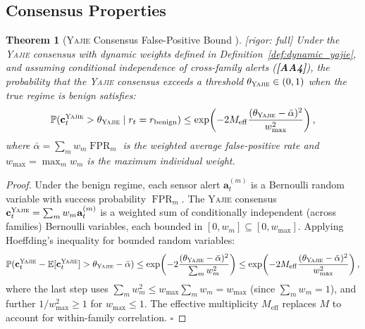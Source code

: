 \documentclass[11pt,a4paper]{article}
\newtheorem{theorem}{Theorem}[section]
\theoremstyle{definition}
\theoremstyle{remark}
\newcommand{\rigorFull}{\textcolor{green!60!black}{[rigor: full]}}
\newcommand{\assumptionTag}[1]{\textsf{\textbf{[A#1]}}}
\newcommand{\Yajie}{\textsc{Yajie}}
\DeclareMathOperator{\FPR}{FPR}
\newcommand{\E}{\mathbb{E}}
\newcommand{\Pbb}{\mathbb{P}}
\newcommand{\alertvec}{\mathbf{a}}
\begin{document}
\subsection{Consensus Properties}

\begin{theorem}[\Yajie{} Consensus False-Positive Bound ]
\label{thm:yajie_fp}
\rigorFull
Under the \Yajie{} consensus with dynamic weights defined in Definition~\ref{def:dynamic_yajie}, and assuming conditional independence of cross-family alerts (\assumptionTag{A4}), the probability that the \Yajie{} consensus exceeds a threshold $\theta_{\Yajie} \in (0, 1)$ when the true regime is benign satisfies:
\begin{equation}
\Pbb(\mathbf{c}_t^{\Yajie} > \theta_{\Yajie} \mid r_t = r_{\mathrm{benign}}) \leq \exp\!\left(-2 M_{\mathrm{eff}} \frac{(\theta_{\Yajie} - \bar{\alpha})^2}{w_{\max}^2}\right),
\label{eq:yajie_fp_bound}
\end{equation}
where $\bar{\alpha} = \sum_m w_m \FPR_m$ is the weighted average false-positive rate and $w_{\max} = \max_m w_m$ is the maximum individual weight.
\end{theorem}

\begin{proof}
Under the benign regime, each sensor alert $\alertvec_t^{(m)}$ is a Bernoulli random variable with success probability $\FPR_m$. The \Yajie{} consensus $\mathbf{c}_t^{\Yajie} = \sum_m w_m \alertvec_t^{(m)}$ is a weighted sum of conditionally independent (across families) Bernoulli variables, each bounded in $[0, w_m] \subseteq [0, w_{\max}]$. Applying Hoeffding's inequality for bounded random variables:
\begin{equation}
\Pbb(\mathbf{c}_t^{\Yajie} - \E[\mathbf{c}_t^{\Yajie}] > \theta_{\Yajie} - \bar{\alpha}) \leq \exp\!\left(-2 \frac{(\theta_{\Yajie} - \bar{\alpha})^2}{\sum_m w_m^2}\right) \leq \exp\!\left(-2 M_{\mathrm{eff}} \frac{(\theta_{\Yajie} - \bar{\alpha})^2}{w_{\max}^2}\right),
\label{eq:yajie_proof}
\end{equation}
where the last step uses $\sum_m w_m^2 \leq w_{\max} \sum_m w_m = w_{\max}$ (since $\sum_m w_m = 1$), and further $1 / w_{\max}^2 \geq 1$ for $w_{\max} \leq 1$. The effective multiplicity $M_{\mathrm{eff}}$ replaces $M$ to account for within-family correlation. $\square$
\end{proof}
\end{document}
